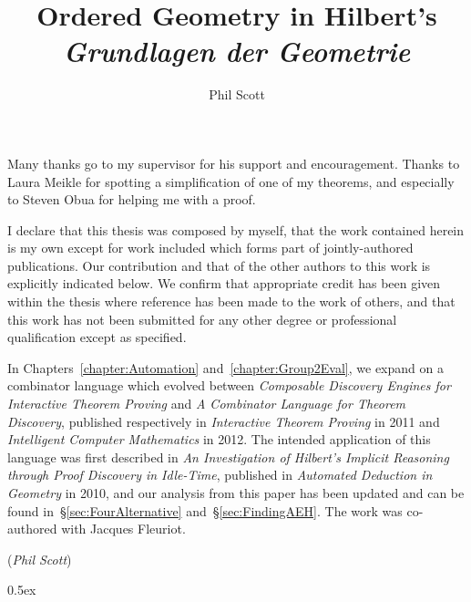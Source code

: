 \documentclass[phd,cisa]{infthesis}
\title{Ordered Geometry in Hilbert's \emph{Grundlagen der Geometrie}}
\author{Phil Scott}
\begin{document}
\begin{preliminary}

\maketitle

\begin{acknowledgements}
Many thanks go to my supervisor for his support and encouragement. Thanks to Laura Meikle for spotting a simplification of one of my theorems, and especially to Steven Obua for helping me with a proof.
\end{acknowledgements}

\begin{declaration}
  I declare that this thesis was composed by myself, that the work contained herein is my own except for work included which forms part of jointly-authored publications. Our contribution and that of the other authors to this work is explicitly indicated below. We confirm that appropriate credit has been given within the thesis where reference has been made to the work of others, and that this work has not been submitted for any other degree or professional qualification except as specified.

In Chapters~\ref{chapter:Automation} and~\ref{chapter:Group2Eval}, we expand on a combinator language which evolved between \emph{Composable Discovery Engines for Interactive Theorem Proving} and \emph{A Combinator Language for Theorem Discovery}, published respectively in \emph{Interactive Theorem Proving} in 2011 and \emph{Intelligent Computer Mathematics} in 2012. The intended application of this language was first described in \emph{An Investigation of Hilbert's Implicit Reasoning through Proof
Discovery in Idle-Time}, published in {\em Automated Deduction in Geometry} in 2010, and our analysis from this paper has been updated and can be found in~\S\ref{sec:FourAlternative} and~\S\ref{sec:FindingAEH}. The work was co-authored with Jacques Fleuriot.
   \par
   \vspace{1in}\raggedleft({\em Phil Scott})
 \end{declaration}

\tableofcontents

\end{preliminary}

\parindent 0pt\parskip 0.5ex
\end{document}
